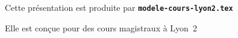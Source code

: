   \item Cette présentation est produite par \texttt{\textbf{modele-cours-lyon2.tex}}
  \item Elle est conçue pour des cours magistraux à Lyon~2
